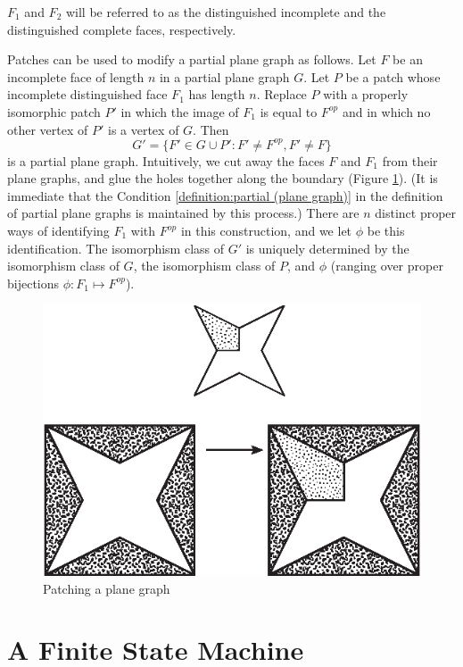 $F_1$ and $F_2$ will be referred to as the distinguished
incomplete and the distinguished complete faces, respectively.

Patches can be used to modify a partial plane graph as follows.
Let $F$ be an incomplete face of length $n$ in a partial plane
graph $G$. Let $P$ be a patch whose incomplete distinguished face
$F_1$ has length $n$. Replace $P$ with a properly isomorphic patch
$P'$ in which the image of $F_1$ is equal to $F^{op}$ and in which
no other vertex of $P'$ is a vertex of $G$. Then
    $$ G' = \{F' \in G\cup P' : F'\ne F^{op}, F'\ne F\}$$
is a partial plane graph. Intuitively, we cut away the faces $F$
and $F_1$ from their plane graphs, and glue the holes together
along the boundary (Figure \ref{fig:patching}). (It is immediate
that the Condition \ref{definition:partial (plane graph)} in the
definition of partial plane graphs is maintained by this process.)
There are $n$ distinct proper ways of identifying $F_1$ with
$F^{op}$ in this construction, and we let $\phi$ be this
identification. The isomorphism class of $G'$ is uniquely
determined by the isomorphism class of $G$, the isomorphism class
of $P$, and $\phi$ (ranging over proper bijections
$\phi:F_1\mapsto F^{op}$).
\begin{figure}[htb]
  \centering
  \includegraphics{PS/patching2.eps}
  \caption{Patching a plane graph}
  \label{fig:patching}
\end{figure}


\section{A Finite State Machine}

